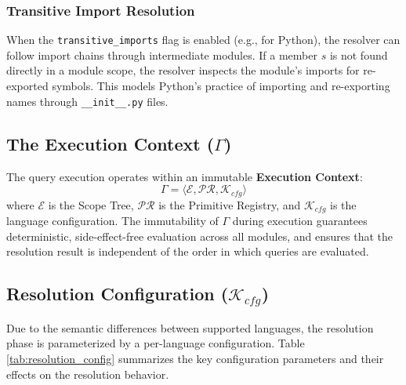 \subsubsection{Transitive Import Resolution}

When the \texttt{transitive\_imports} flag is enabled (e.g., for Python), the resolver can follow import chains through intermediate modules. If a member $s$ is not found directly in a module scope, the resolver inspects the module's imports for re-exported symbols. This models Python's practice of importing and re-exporting names through \texttt{\_\_init\_\_.py} files.

\subsection{The Execution Context ($\Gamma$)}

The query execution operates within an immutable \textbf{Execution Context}:
$$\Gamma = \langle \mathcal{E}, \mathcal{PR}, \mathcal{K}_{cfg} \rangle$$
where $\mathcal{E}$ is the Scope Tree, $\mathcal{PR}$ is the Primitive Registry, and $\mathcal{K}_{cfg}$ is the language configuration. The immutability of $\Gamma$ during execution guarantees deterministic, side-effect-free evaluation across all modules, and ensures that the resolution result is independent of the order in which queries are evaluated.

\subsection{Resolution Configuration ($\mathcal{K}_{cfg}$)}

Due to the semantic differences between supported languages, the resolution phase is parameterized by a per-language configuration. Table \ref{tab:resolution_config} summarizes the key configuration parameters and their effects on the resolution behavior.


